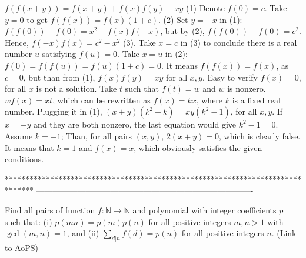 \begin{solution}
	$ f(f(x + y)) = f(x + y) + f(x)f(y) - xy$     (1)
     Denote $ f(0) = c$.
     Take $ y = 0$ to get    $ f(f(x)) = f(x)(1 + c)$.    (2)
     Set $ y = - x$ in (1):    $ f(f(0)) - f(0) = x^{2} - f(x)f( - x)$, but  by (2),  $ f(f(0)) - f(0) = c^{2}$.  
Hence, $ f( - x)f(x) = c^{2} - x^{2}$   (3).   Take $ x = c$  in (3) to conclude there is a real number $ u$ satisfying $ f(u) = 0$. Take $ x = u$ in (2):   $ f(0) = f(f(u)) = f(u)(1 + c) = 0$. It means $ f(f(x)) = f(x)$, as $ c = 0$, but than from (1),  $ f(x)f(y) = xy$  for all $ x,y$.
     Easy to verify $ f(x) = 0$, for all $ x$ is not a solution. Take $ t$ such that $ f(t) = w$ and $ w$ is nonzero.  
     $ wf(x) = xt$, which can be rewritten as $ f(x) = kx$, where $ k$ is a fixed real number. Plugging it in (1),  
     $ (x + y)(k^{2} - k) = xy(k^{2} - 1)$, for all $ x,y$. If $ x = - y$ and they are both nonzero, the last equation would give $ k^{2} - 1 = 0$. Assume $ k = - 1$;  Than, for all pairs $ (x,y)$, $ 2(x + y) = 0$, which is clearly false. It means that $ k = 1$ and $ f(x) = x$, which obviously satisfies the given conditions.
\end{solution}
*******************************************************************************
-------------------------------------------------------------------------------

\begin{problem}
	Find all pairs of function $ f: \mathbb{N} \rightarrow \mathbb{N}$ and polynomial with integer coefficients $ p$ such that:
(i) $ p(mn) = p(m)p(n)$ for all positive integers $ m,n > 1$ with $ \gcd(m,n) = 1$, and
(ii) $ \sum_{d|n}f(d) = p(n)$ for all positive integers $ n$.
	\flushright \href{https://artofproblemsolving.com/community/c6h312088}{(Link to AoPS)}
\end{problem}



